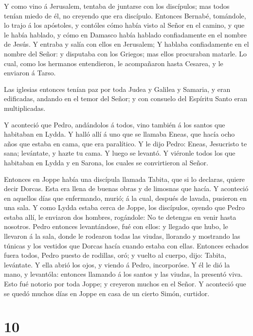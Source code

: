  Y como vino á Jerusalem, tentaba de juntarse con los
discípulos; mas todos tenían miedo de él, no creyendo que era discípulo.
 Entonces Bernabé, tomándole, lo trajo á los apóstoles, y
contóles cómo había visto al Señor en el camino, y que le había hablado,
y cómo en Damasco había hablado confiadamente en el nombre de Jesús.
 Y entraba y salía con ellos en Jerusalem;  Y
hablaba confiadamente en el nombre del Señor: y disputaba con los
Griegos; mas ellos procuraban matarle.  Lo cual, como los
hermanos entendieron, le acompañaron hasta Cesarea, y le enviaron á
Tarso.

 Las iglesias entonces tenían paz por toda Judea y Galilea
y Samaria, y eran edificadas, andando en el temor del Señor; y con
consuelo del Espíritu Santo eran multiplicadas.

 Y aconteció que Pedro, andándolos á todos, vino también á
los santos que habitaban en Lydda.  Y halló allí á uno que
se llamaba Eneas, que hacía ocho años que estaba en cama, que era
paralítico.  Y le dijo Pedro: Eneas, Jesucristo te sana;
levántate, y hazte tu cama. Y luego se levantó.  Y viéronle
todos los que habitaban en Lydda y en Sarona, los cuales se convirtieron
al Señor.

 Entonces en Joppe había una discípula llamada Tabita, que
si lo declaras, quiere decir Dorcas. Esta era llena de buenas obras y de
limosnas que hacía.  Y aconteció en aquellos días que
enfermando, murió; á la cual, después de lavada, pusieron en una sala.
 Y como Lydda estaba cerca de Joppe, los discípulos, oyendo
que Pedro estaba allí, le enviaron dos hombres, rogándole: No te
detengas en venir hasta nosotros.  Pedro entonces
levantándose, fué con ellos: y llegado que hubo, le llevaron á la sala,
donde le rodearon todas las viudas, llorando y mostrando las túnicas y
los vestidos que Dorcas hacía cuando estaba con ellas. 
Entonces echados fuera todos, Pedro puesto de rodillas, oró; y vuelto al
cuerpo, dijo: Tabita, levántate. Y ella abrió los ojos, y viendo á
Pedro, incorporóse.  Y él le dió la mano, y levantóla:
entonces llamando á los santos y las viudas, la presentó viva.
 Esto fué notorio por toda Joppe; y creyeron muchos en el
Señor.  Y aconteció que se quedó muchos días en Joppe en
casa de un cierto Simón, curtidor.

\hypertarget{section-9}{%
\section{10}\label{section-9}}

